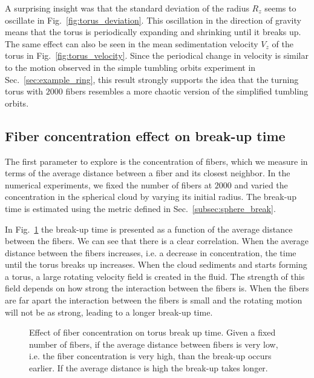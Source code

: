 A surprising insight was that the standard deviation of the radius $R_z$ seems to oscillate in Fig.~\ref{fig:torus_deviation}. This oscillation in the direction of gravity means that the torus is periodically expanding and shrinking until it breaks up. The same effect can also be seen in the mean sedimentation velocity $V_z$ of the torus in Fig.~\ref{fig:torus_velocity}. Since the periodical change in velocity is similar to the motion observed in the simple tumbling orbits experiment in Sec.~\ref{sec:example_ring},  this result strongly supports the idea that the turning torus with $2000$ fibers resembles a more chaotic version of the simplified tumbling orbits.

\subsection{Fiber concentration effect on break-up time}
\label{subsec:effect_concentration}

The first parameter to explore is the concentration of fibers, which we measure in terms of the average distance between a fiber and its closest neighbor. In the numerical experiments, we fixed the number of fibers at $2000$ and varied the concentration in the spherical cloud by varying its initial radius. The break-up time is estimated using the metric defined in Sec.~\ref{subsec:sphere_break}.

In Fig.~\ref{fig:concentration_breakup} the break-up time is presented as a function of the average distance between the fibers. We can see that there is a clear correlation. When the average distance between the fibers increases, i.e. a decrease in concentration, the time until the torus breaks up increases. When the cloud sediments and starts forming a torus, a large rotating velocity field is created in the fluid. The strength of this field depends on how strong the interaction between the fibers is. When the fibers are far apart the interaction between the fibers is small and the rotating motion will not be as strong, leading to a longer break-up time.

\begin{figure}[!htbp]
  \centering
  \caption[Effect of fiber concentration on torus break up time.]{Effect of fiber concentration on torus break up time. Given a fixed number of fibers, if the average distance between fibers is very low, i.e. the fiber concentration is very high, than the break-up occurs earlier. If the average distance is high the break-up takes longer.}
  \label{fig:concentration_breakup}
\end{figure}

